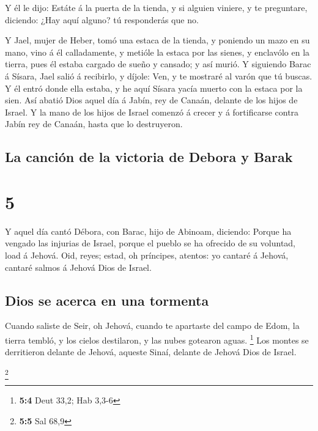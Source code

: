  Y él le dijo: Estáte á la puerta de la tienda, y si
alguien viniere, y te preguntare, diciendo: ¿Hay aquí alguno? tú
responderás que no.

 Y Jael, mujer de Heber, tomó una estaca de la tienda, y
poniendo un mazo en su mano, vino á él calladamente, y metióle la estaca
por las sienes, y enclavólo en la tierra, pues él estaba cargado de
sueño y cansado; y así murió.  Y siguiendo Barac á
Sísara, Jael salió á recibirlo, y díjole: Ven, y te mostraré al varón
que tú buscas. Y él entró donde ella estaba, y he aquí Sísara yacía
muerto con la estaca por la sien.  Así abatió Dios aquel
día á Jabín, rey de Canaán, delante de los hijos de Israel.
 Y la mano de los hijos de Israel comenzó á crecer y á
fortificarse contra Jabín rey de Canaán, hasta que lo destruyeron.

\hypertarget{la-canciuxf3n-de-la-victoria-de-debora-y-barak}{%
\subsection{La canción de la victoria de Debora y
Barak}\label{la-canciuxf3n-de-la-victoria-de-debora-y-barak}}

\hypertarget{section-4}{%
\section{5}\label{section-4}}

 Y aquel día cantó Débora, con Barac, hijo de Abinoam,
diciendo:  Porque ha vengado las injurias de Israel,
porque el pueblo se ha ofrecido de su voluntad, load á Jehová.
 Oid, reyes; estad, oh príncipes, atentos: yo cantaré á
Jehová, cantaré salmos á Jehová Dios de Israel.

\hypertarget{dios-se-acerca-en-una-tormenta}{%
\subsection{Dios se acerca en una
tormenta}\label{dios-se-acerca-en-una-tormenta}}

 Cuando saliste de Seir, oh Jehová, cuando te apartaste
del campo de Edom, la tierra tembló, y los cielos destilaron, y las
nubes gotearon aguas. \footnote{\textbf{5:4} Deut 33,2; Hab 3,3-6}
 Los montes se derritieron delante de Jehová, aqueste
Sinaí, delante de Jehová Dios de Israel.

\footnote{\textbf{5:5} Sal 68,9}

